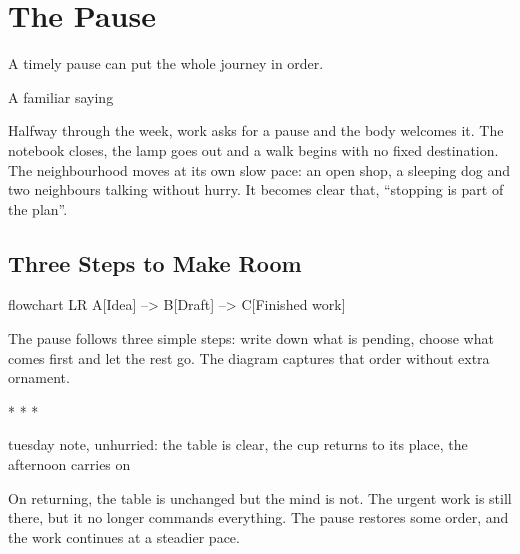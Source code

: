 \chapter{The Pause}

\epigraph{A timely pause can put the whole journey in order.}{A familiar saying}

Halfway through the week, work asks for a pause and the body welcomes it.
The notebook closes, the lamp goes out and a walk begins with no fixed
destination. The neighbourhood moves at its own slow pace: an open shop, a
sleeping dog and two neighbours talking without hurry. It becomes clear
that, \enquote{stopping is part of the plan}.

\section{Three Steps to Make Room}

\begin{mermaid}[style=monochrome, width=0.85\linewidth, caption={From the first idea to a finished form}, pos=H]
  flowchart LR
  A[Idea] --> B[Draft] --> C[Finished work]
\end{mermaid}

The pause follows three simple steps: write down what is pending, choose
what comes first and let the rest go. The diagram captures that order
without extra ornament.

\begin{center}
  * * *
\end{center}

\begin{code}[lang=text]
tuesday note, unhurried:
the table is clear,
the cup returns to its place,
the afternoon carries on
\end{code}

On returning, the table is unchanged but the mind is not. The urgent work
is still there, but it no longer commands everything. The pause restores
some order, and the work continues at a steadier pace.
